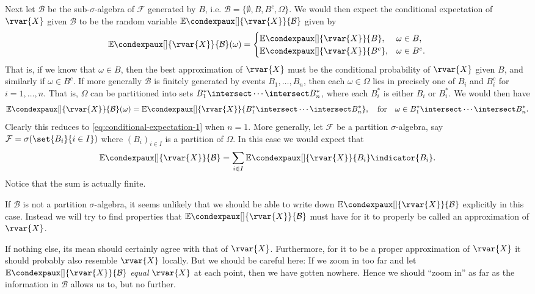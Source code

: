 \documentclass[article, a4paper, 11pt, oneside]{memoir}
\numberwithin{equation}{chapter}
\newcommand{\calB}{\mathcal{B}}
\newcommand{\calF}{\mathcal{F}}
\newcommand{\condexp}[3][]{{\mathbb{E}\condexpaux[#1]{#2}{#3}}}
\begin{document}
Next let $\calB$ be the sub-$\sigma$-algebra of $\calF$ generated by $B$, i.e. $\calB = \{ \emptyset, B, B^c, \Omega \}$. We would then expect the conditional expectation of $\rvar{X}$ given $\calB$ to be the random variable $\condexp{\rvar{X}}{\calB}$ given by
%
\begin{equation}
    \label{eq:conditional-expectation-1}
    \condexp{\rvar{X}}{\calB}(\omega)
        =
        \begin{cases}
            \condexp{\rvar{X}}{B},   & \omega \in B, \\
            \condexp{\rvar{X}}{B^c}, & \omega \in B^c.
        \end{cases}
\end{equation}
%
That is, if we know that $\omega \in B$, then the best approximation of $\rvar{X}$ must be the conditional probability of $\rvar{X}$ given $B$, and similarly if $\omega \in B^c$. If more generally $\calB$ is finitely generated by events $B_1, \ldots, B_n$, then each $\omega \in \Omega$ lies in precisely one of $B_i$ and $B_i^c$ for $i = 1, \ldots, n$. That is, $\Omega$ can be partitioned into sets $B_1^* \intersect \cdots \intersect B_n^*$, where each $B_i^*$ is either $B_i$ or $B_i^*$. We would then have
%
\begin{equation*}
    \condexp{\rvar{X}}{\calB}(\omega)
        = \condexp{\rvar{X}}{ B_1^* \intersect \cdots \intersect B_n^* },
        \quad \text{for} \quad
        \omega \in B_1^* \intersect \cdots \intersect B_n^*.
\end{equation*}
%
Clearly this reduces to \cref{eq:conditional-expectation-1} when $n = 1$. More generally, let $\calF$ be a partition $\sigma$-algebra, say $\calF = \sigma( \set{B_i}{i \in I} )$ where $(B_i)_{i \in I}$ is a partition of $\Omega$. In this case we would expect that
%
\begin{equation*}
    \condexp{\rvar{X}}{\calB}
        = \sum_{i \in I} \condexp{\rvar{X}}{B_i} \indicator{B_i}.
\end{equation*}
%
Notice that the sum is actually finite.

If $\calB$ is not a partition $\sigma$-algebra, it seems unlikely that we should be able to write down $\condexp{\rvar{X}}{\calB}$ explicitly in this case. Instead we will try to find properties that $\condexp{\rvar{X}}{\calB}$ must have for it to properly be called an approximation of $\rvar{X}$.

If nothing else, its mean should certainly agree with that of $\rvar{X}$. Furthermore, for it to be a proper approximation of $\rvar{X}$ it should probably also resemble $\rvar{X}$ locally. But we should be careful here: If we zoom in too far and let $\condexp{\rvar{X}}{\calB}$ \emph{equal} $\rvar{X}$ at each point, then we have gotten nowhere. Hence we should \enquote{zoom in} as far as the information in $\calB$ allows us to, but no further.
\end{document}
